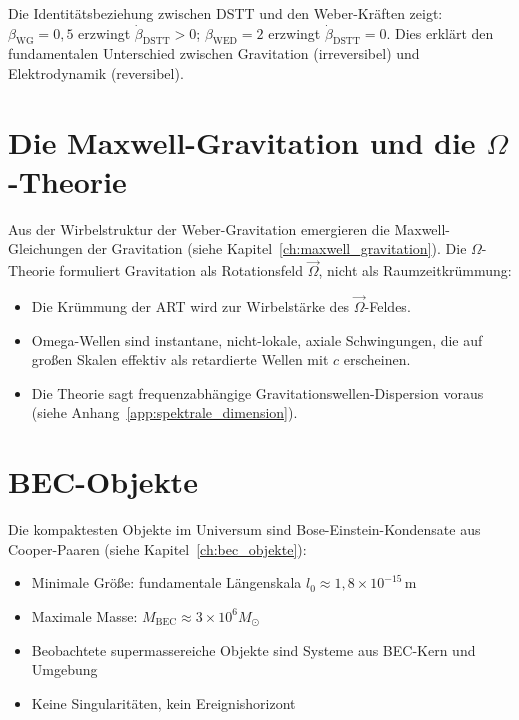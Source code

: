 Die Identitätsbeziehung zwischen DSTT und den Weber-Kräften zeigt: \( \beta_{\text{WG}} = 0,5 \) erzwingt \( \dot{\beta}_{\text{DSTT}} > 0 \); \( \beta_{\text{WED}} = 2 \) erzwingt \( \dot{\beta}_{\text{DSTT}} = 0 \). Dies erklärt den fundamentalen Unterschied zwischen Gravitation (irreversibel) und Elektrodynamik (reversibel).

\section{Die Maxwell-Gravitation und die \( \Omega \)-Theorie}
\label{sec:maxwell_omega_zf}

Aus der Wirbelstruktur der Weber-Gravitation emergieren die Maxwell-Gleichungen der Gravitation (siehe Kapitel~\ref{ch:maxwell_gravitation}). Die \( \Omega \)-Theorie formuliert Gravitation als Rotationsfeld \( \vec{\Omega} \), nicht als Raumzeitkrümmung:

\begin{itemize}
    \item Die Krümmung der ART wird zur Wirbelstärke des \( \vec{\Omega} \)-Feldes.
    \item Omega-Wellen sind instantane, nicht-lokale, axiale Schwingungen, die auf großen Skalen effektiv als retardierte Wellen mit \( c \) erscheinen.
    \item Die Theorie sagt frequenzabhängige Gravitationswellen-Dispersion voraus (siehe Anhang~\ref{app:spektrale_dimension}).
\end{itemize}

\section{BEC-Objekte}
\label{sec:bec_zf}

Die kompaktesten Objekte im Universum sind Bose-Einstein-Kondensate aus Cooper-Paaren (siehe Kapitel~\ref{ch:bec_objekte}):

\begin{itemize}
    \item Minimale Größe: fundamentale Längenskala \( l_0 \approx 1,8 \times 10^{-15} \, \text{m} \)
    \item Maximale Masse: \( M_{\text{BEC}} \approx 3 \times 10^6 M_\odot \)
    \item Beobachtete supermassereiche Objekte sind Systeme aus BEC-Kern und Umgebung
    \item Keine Singularitäten, kein Ereignishorizont
\end{itemize}

